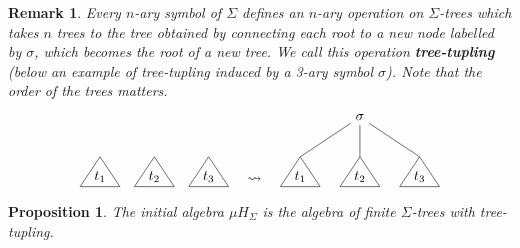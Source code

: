 \documentclass[letterpaper, 11pt, oneside]{memoir}
\theoremstyle{myteo}
\newtheorem{proposition}[theorem]{Proposition}
\newtheorem{remark}[theorem]{Remark}
\numberwithin{equation}{section}
\newcommand{\marginnote}[1]{\marginpar{\footnotesize #1}}
\begin{document}
\begin{remark}
  Every \(n\)-ary symbol of \(\Sigma\) defines an \(n\)-ary operation on \(\Sigma\)-trees which takes \(n\) trees to the tree obtained by connecting each root to a new node labelled by \(\sigma\), which becomes the root of a new tree.
  We call this operation \textbf{tree-tupling} (below an example of tree-tupling induced by a 3-ary symbol \(\sigma\)).\marginnote{tree-tupling}
  Note that the order of the trees matters.
  \begin{equation*}
    \begin{tikzpicture}
      \node (t) at (0,0){\(t_1\)};
      \draw[-] (0,0.5) -- (.5, -.25) -- (-.5, -.25) -- (0, .5);
    \end{tikzpicture}\quad
    \begin{tikzpicture}
      \node (t) at (0,0){\(t_2\)};
      \draw[-] (0,0.5) -- (.5, -.25) -- (-.5, -.25) -- (0, .5);
    \end{tikzpicture}\quad
    \begin{tikzpicture}
      \node (t) at (0,0){\(t_3\)};
      \draw[-] (0,0.5) -- (.5, -.25) -- (-.5, -.25) -- (0, .5);
    \end{tikzpicture}\quad
    \begin{tikzpicture}
      \node (t) at (0, 3){\(\rightsquigarrow\)};
    \end{tikzpicture}\quad
    \begin{tikzpicture}
      \node (t1) at (0,0){\(t_1\)};
      \node (t2) at (1.5,0){\(t_2\)};
      \node (t3) at (3,0){\(t_3\)};
      \node (s) at (1.5, 1.5){\(\sigma\)};
      
      \draw[-] (0,0.5) -- (.5, -.25) -- (-.5, -.25) -- (0, .5);
      \draw[-] (1.5,0.5) -- (2, -.25) -- (1, -.25) -- (1.5, .5);
      \draw[-] (3,0.5) -- (3.5, -.25) -- (2.5, -.25) -- (3, .5);

      \draw[-] (s) -- (0,0.5);
      \draw[-] (s) -- (1.5,0.5);
      \draw[-] (s) -- (3,0.5);
    \end{tikzpicture}
  \end{equation*}
\end{remark}

\begin{proposition}
  \label{prop:finite_sigma_trees}
  The initial algebra \(\mu H_\Sigma\) is the algebra of finite \(\Sigma\)-trees with tree-tupling.
\end{proposition}
\end{document}
